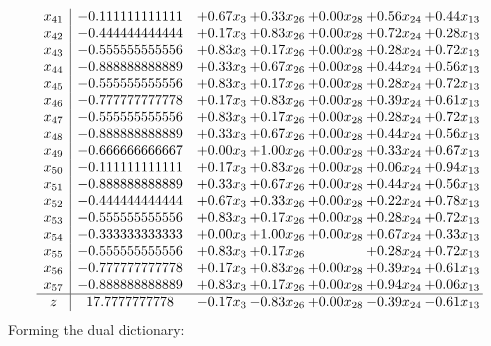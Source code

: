 \documentclass[8pt]{article}
\begin{document}
\[\begin{array}{c| c c@{\hskip 2pt} c@{\hskip 2pt} c@{\hskip 2pt} c@{\hskip 2pt} c@{\hskip 2pt} }
 x_{41}   &  -0.111111111111 & +  0.67 x_{3} & +  0.33 x_{26} & +  0.00 x_{28} & +  0.56 x_{24} & +  0.44 x_{13}\\
 x_{42}   &  -0.444444444444 & +  0.17 x_{3} & +  0.83 x_{26} & +  0.00 x_{28} & +  0.72 x_{24} & +  0.28 x_{13}\\
 x_{43}   &  -0.555555555556 & +  0.83 x_{3} & +  0.17 x_{26} & +  0.00 x_{28} & +  0.28 x_{24} & +  0.72 x_{13}\\
 x_{44}   &  -0.888888888889 & +  0.33 x_{3} & +  0.67 x_{26} & +  0.00 x_{28} & +  0.44 x_{24} & +  0.56 x_{13}\\
 x_{45}   &  -0.555555555556 & +  0.83 x_{3} & +  0.17 x_{26} & +  0.00 x_{28} & +  0.28 x_{24} & +  0.72 x_{13}\\
 x_{46}   &  -0.777777777778 & +  0.17 x_{3} & +  0.83 x_{26} & +  0.00 x_{28} & +  0.39 x_{24} & +  0.61 x_{13}\\
 x_{47}   &  -0.555555555556 & +  0.83 x_{3} & +  0.17 x_{26} & +  0.00 x_{28} & +  0.28 x_{24} & +  0.72 x_{13}\\
 x_{48}   &  -0.888888888889 & +  0.33 x_{3} & +  0.67 x_{26} & +  0.00 x_{28} & +  0.44 x_{24} & +  0.56 x_{13}\\
 x_{49}   &  -0.666666666667 & +  0.00 x_{3} & +  1.00 x_{26} & +  0.00 x_{28} & +  0.33 x_{24} & +  0.67 x_{13}\\
 x_{50}   &  -0.111111111111 & +  0.17 x_{3} & +  0.83 x_{26} & +  0.00 x_{28} & +  0.06 x_{24} & +  0.94 x_{13}\\
 x_{51}   &  -0.888888888889 & +  0.33 x_{3} & +  0.67 x_{26} & +  0.00 x_{28} & +  0.44 x_{24} & +  0.56 x_{13}\\
 x_{52}   &  -0.444444444444 & +  0.67 x_{3} & +  0.33 x_{26} & +  0.00 x_{28} & +  0.22 x_{24} & +  0.78 x_{13}\\
 x_{53}   &  -0.555555555556 & +  0.83 x_{3} & +  0.17 x_{26} & +  0.00 x_{28} & +  0.28 x_{24} & +  0.72 x_{13}\\
 x_{54}   &  -0.333333333333 & +  0.00 x_{3} & +  1.00 x_{26} & +  0.00 x_{28} & +  0.67 x_{24} & +  0.33 x_{13}\\
 x_{55}   &  -0.555555555556 & +  0.83 x_{3} & +  0.17 x_{26} &   & +  0.28 x_{24} & +  0.72 x_{13}\\
 x_{56}   &  -0.777777777778 & +  0.17 x_{3} & +  0.83 x_{26} & +  0.00 x_{28} & +  0.39 x_{24} & +  0.61 x_{13}\\
 x_{57}   &  -0.888888888889 & +  0.83 x_{3} & +  0.17 x_{26} & +  0.00 x_{28} & +  0.94 x_{24} & +  0.06 x_{13}\\
\hline
z    &  17.7777777778 & -0.17 x_{3} & -0.83 x_{26} & +  0.00 x_{28} & -0.39 x_{24} & -0.61 x_{13}\\
\end{array}\]
Forming the dual dictionary:
\end{document}
